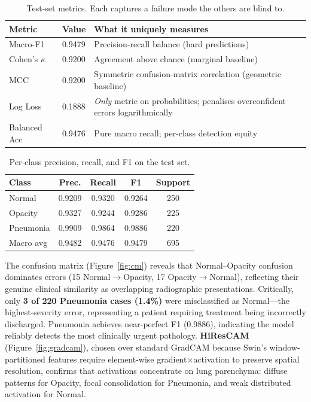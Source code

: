 \documentclass[11pt,a4paper]{article}
\begin{document}
\begin{table}[H]
\centering
\caption{Test-set metrics. Each captures a failure mode the others are blind to.}
\label{tab:test}
\begin{tabular}{@{}llp{5.2cm}@{}}
\toprule
\textbf{Metric} & \textbf{Value} & \textbf{What it uniquely measures} \\
\midrule
Macro-F1 & 0.9479 & Precision-recall balance (hard predictions) \\
Cohen's $\kappa$ & 0.9200 & Agreement above chance (marginal baseline)~\cite{sokolova2009} \\
MCC & 0.9200 & Symmetric confusion-matrix correlation (geometric baseline)~\cite{chicco2020} \\
Log Loss & 0.1888 & \emph{Only} metric on probabilities; penalises overconfident errors logarithmically \\
Balanced Acc & 0.9476 & Pure macro recall; per-class detection equity \\
\bottomrule
\end{tabular}
\end{table}

\begin{table}[H]
\centering
\caption{Per-class precision, recall, and F1 on the test set.}
\label{tab:perclass}
\begin{tabular}{@{}lcccc@{}}
\toprule
\textbf{Class} & \textbf{Prec.} & \textbf{Recall} & \textbf{F1} & \textbf{Support} \\
\midrule
Normal & 0.9209 & 0.9320 & 0.9264 & 250 \\
Opacity & 0.9327 & 0.9244 & 0.9286 & 225 \\
Pneumonia & 0.9909 & 0.9864 & 0.9886 & 220 \\
\midrule
Macro avg & 0.9482 & 0.9476 & 0.9479 & 695 \\
\bottomrule
\end{tabular}
\end{table}

The confusion matrix (Figure~\ref{fig:cm}) reveals that Normal--Opacity confusion dominates errors (15 Normal$\to$Opacity, 17 Opacity$\to$Normal), reflecting their genuine clinical similarity as overlapping radiographic presentations. Critically, only \textbf{3 of 220 Pneumonia cases (1.4\%)} were misclassified as Normal---the highest-severity error, representing a patient requiring treatment being incorrectly discharged. Pneumonia achieves near-perfect F1 (0.9886), indicating the model reliably detects the most clinically urgent pathology. \textbf{HiResCAM}~\cite{draelos2021} (Figure~\ref{fig:gradcam}), chosen over standard GradCAM because Swin's window-partitioned features require element-wise gradient$\times$activation to preserve spatial resolution, confirms that activations concentrate on lung parenchyma: diffuse patterns for Opacity, focal consolidation for Pneumonia, and weak distributed activation for Normal.
\end{document}
